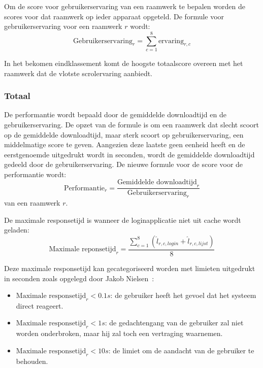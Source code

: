 Om de score voor gebruikerservaring van een raamwerk te bepalen worden de scores voor dat raamwerk op ieder apparaat opgeteld. De formule voor gebruikerservaring voor een raamwerk $r$ wordt:
\begin{equation}
  \text{Gebruikerservaring}_r = \sum_{c=1}^{8}{\text{ervaring}_{r,c}}
  \label{eq:performantie-gebruikservaring}
\end{equation}

In het bekomen eindklassement komt de hoogste totaalscore overeen met het raamwerk dat de vlotste scrolervaring aanbiedt. 

\subsubsection{Totaal}
De performantie wordt bepaald door de gemiddelde downloadtijd en de gebruikerservaring.
De opzet van de formule is om een raamwerk dat slecht scoort op de gemiddelde downloadtijd, maar sterk scoort op gebruikerservaring, een middelmatige score te geven.
Aangezien deze laatste geen eenheid heeft en de eerstgenoemde uitgedrukt wordt in seconden, wordt de gemiddelde downloadtijd gedeeld door de gebruikerservaring. De nieuwe formule voor de score voor de performantie wordt:
\begin{equation}
  \text{Performantie}_r = \frac{\text{Gemiddelde downloadtijd}_r}{\text{Gebruikerservaring}_r}
  \label{eq:performantie-enhanced}
\end{equation}
van een raamwerk $r$. 


De maximale responsetijd is wanneer de loginapplicatie niet uit cache wordt geladen:
\begin{equation}
  \text{Maximale reponsetijd}_r= \frac{\sum\limits_{c=1}^{8}\left(\widehat{l}_{r,c,login} + \widehat{l}_{r,c,lijst}\right)}{8}
  \label{eq:performantie-max}
\end{equation}

Deze maximale responsetijd kan gecategoriseerd worden met limieten uitgedrukt in seconden zoals opgelegd door Jakob Nielsen~\cite{Nielsen1993}:  
\begin{itemize}
\item $\text{Maximale responsetijd}_r < 0.1\unit{s}$: de gebruiker heeft het gevoel dat het systeem direct reageert.
\item $\text{Maximale responsetijd}_r < 1\unit{s}$: de gedachtengang van de gebruiker zal niet worden onderbroken, maar hij zal toch een vertraging waarnemen.
\item $\text{Maximale responsetijd}_r < 10\unit{s}$: de limiet om de aandacht van de gebruiker te behouden.
\end{itemize}

